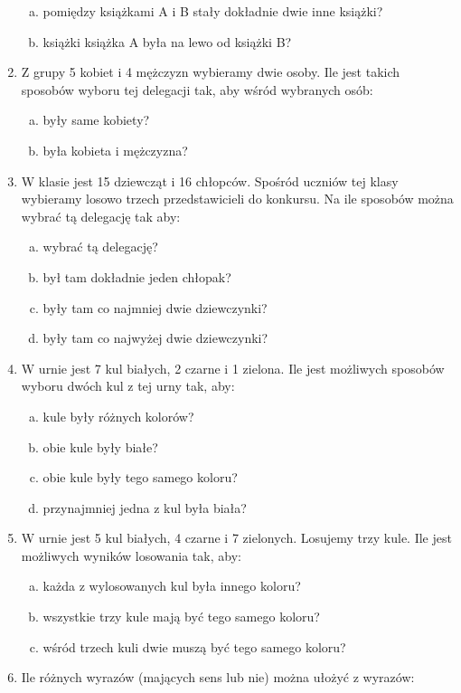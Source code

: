 \documentclass[12pt,a4paper]{article}
\begin{document}
\begin{enumerate}[1.]
\begin{enumerate}[a)]
		\item pomiędzy książkami A i B stały dokładnie dwie inne książki?
		\item książki książka A była na lewo od książki B?
	\end{enumerate}
\item Z grupy 5 kobiet i 4 mężczyzn wybieramy dwie osoby. Ile jest takich sposobów wyboru tej delegacji tak, aby wśród wybranych osób:
\begin{enumerate}[a)]
	\item były same kobiety?
	\item była kobieta i mężczyzna?
\end{enumerate}
\item W klasie jest 15 dziewcząt i 16 chłopców. Spośród uczniów tej klasy wybieramy losowo trzech przedstawicieli do konkursu. Na ile sposobów można wybrać tą delegację tak aby:
\begin{enumerate}[a)]
	\item wybrać tą delegację?
	\item był tam dokładnie jeden chłopak?
	\item były tam co najmniej dwie dziewczynki?
	\item były tam co najwyżej dwie dziewczynki?
\end{enumerate}
\newpage
\item W urnie jest 7 kul białych, 2 czarne i 1 zielona. Ile jest możliwych sposobów wyboru dwóch kul z tej urny tak, aby:
\begin{enumerate}[a)]
	\item kule były różnych kolorów?
	\item obie kule były białe?
	\item obie kule były tego samego koloru?
	\item przynajmniej jedna z kul była biała?
\end{enumerate}
\item W urnie jest 5 kul białych, 4 czarne i 7 zielonych. Losujemy trzy kule. Ile jest możliwych wyników losowania tak, aby:
\begin{enumerate}[a)]
	\item każda z wylosowanych kul była innego koloru?
	\item wszystkie trzy kule mają być tego samego koloru?
	\item wśród trzech kuli dwie muszą być tego samego koloru?
\end{enumerate}
\item Ile różnych wyrazów (mających sens lub nie) można ułożyć z wyrazów:

\end{enumerate}
\end{document}
